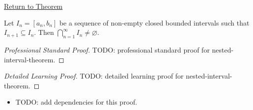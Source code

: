 \newpage
{}
\label{prf:nested-interval-theorem}

\begin{remark*}[Return]
\hyperref[thm:nested-interval-theorem]{Return to Theorem}
\end{remark*}

\begin{theorem*}
Let $I_n = [a_n, b_n]$ be a sequence of non-empty closed bounded intervals such that $I_{n+1} \subseteq I_n$. Then $\bigcap_{n=1}^\infty I_n \neq \varnothing$.
\end{theorem*}

\begin{proof}[Professional Standard Proof]
\LRAProofBodyStart
TODO: professional standard proof for nested-interval-theorem.
\end{proof}

\begin{proof}[Detailed Learning Proof]
\LRAProofBodyStart
TODO: detailed learning proof for nested-interval-theorem.
\end{proof}

\begin{remark*}
\end{remark*}

\begin{dependencies}
\begin{itemize}
  \item TODO: add dependencies for this proof.
\end{itemize}
\end{dependencies}

\clearpage
